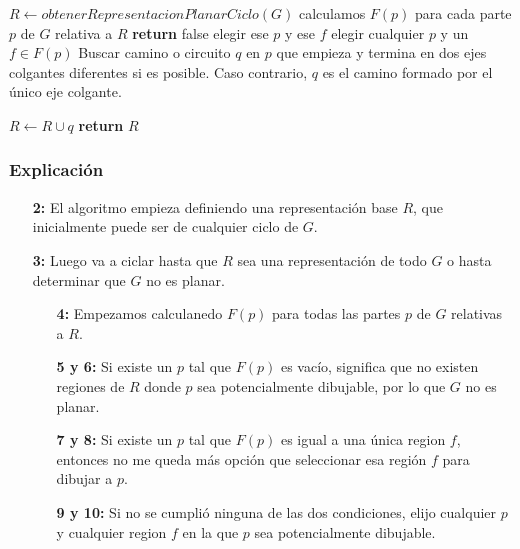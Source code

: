 \begin{algorithm}
\begin{algorithmic}[1]
    \State $R \gets obtenerRepresentacionPlanarCiclo(G)$
        \State calculamos $F(p)$ para cada parte $p$ de $G$ relativa a $R$
            \State \textbf{return} false
            \State elegir ese $p$ y ese $f$
        \Else
            \State elegir cualquier $p$ y un $f \in F(p)$ 
        \EndIf
        \State Buscar camino o circuito $q$ en $p$ que empieza y termina en dos
        \State ejes colgantes diferentes si es posible. Caso contrario, $q$ es
        \State el camino formado por el \'unico eje colgante.
    
        \State $R \gets R \cup q$
    \EndWhile
    \State \textbf{return} $R$
\EndFunction
\end{algorithmic}
\end{algorithm}

\subsubsection*{Explicaci\'on}

\begin{enumerate}
\item [\textbf{2:}] El algoritmo empieza definiendo una representaci\'on base $R$, que inicialmente puede ser de cualquier ciclo de $G$. 
\item [\textbf{3:}] Luego va a ciclar hasta que $R$ sea una representaci\'on de todo $G$ o hasta determinar que $G$ no es planar.
    \begin{enumerate}
    \item [\textbf{4:}] Empezamos calculanedo $F(p)$ para todas las partes $p$ de $G$ relativas a $R$.
    \item [\textbf{5 y 6:}] Si existe un $p$ tal que $F(p)$ es vac\'io, significa que no existen regiones de $R$ donde $p$ sea potencialmente dibujable, por lo que $G$ no es planar.
    \item [\textbf{7 y 8:}] Si existe un $p$ tal que $F(p)$ es igual a una \'unica region $f$, entonces no me queda m\'as opci\'on que seleccionar esa regi\'on $f$ para dibujar a $p$.
    \item [\textbf{9 y 10:}] Si no se cumpli\'o ninguna de las dos condiciones, elijo cualquier $p$ y cualquier region $f$ en la que $p$ sea potencialmente dibujable.
    \end{enumerate}
\end{enumerate}
